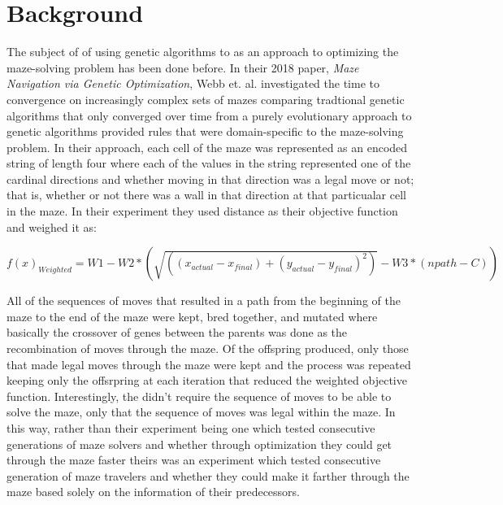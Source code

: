 \documentclass[12pt]{article}
\begin{document}
\section{Background}

\hspace*{\parindent} The subject of of using genetic algorithms to as an approach to optimizing the maze-solving problem has been done before. In their 2018 paper, \textit{Maze Navigation via Genetic Optimization}, Webb et. al. investigated the time to convergence on increasingly complex sets of mazes comparing tradtional genetic algorithms that only converged over time from a purely evolutionary approach to genetic algorithms provided rules that were domain-specific to the maze-solving problem. In their approach, each cell of the maze was represented as an encoded string of length four where each of the values in the string represented one of the cardinal directions and whether moving in that direction was a legal move or not; that is, whether or not there was a wall in that direction at that particualar cell in the maze. In their experiment they used distance as their objective function and weighed it as: 

\begin{center}
 $f(x)_{Weighted} = W1 - W2 * (\sqrt{((x_{actual}-x_{final})+(y_{actual}-y_{final})^2)}-W3*(npath-C))$ 
\end{center}

All of the sequences of moves that resulted in a path from the beginning of the maze to the end of the maze were kept, bred together, and mutated where basically the crossover of genes between the parents was done as the recombination of moves through the maze. Of the offspring produced, only those that made legal moves through the maze were kept and the process was repeated keeping only the offsrpring at each iteration that reduced the weighted objective function. Interestingly, the didn't require the sequence of moves to be able to solve the maze, only that the sequence of moves was legal within the maze. In this way, rather than their experiment being one which tested consecutive generations of maze solvers and whether through optimization they could get through the maze faster theirs was an experiment which tested consecutive generation of maze travelers and whether they could make it farther through the maze based solely on the information of their predecessors. 
\end{document}
